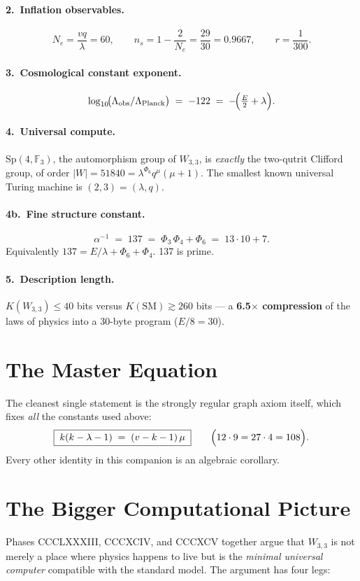 \documentclass[11pt,a4paper]{article}
\begin{document}
\paragraph{2.\ Inflation observables.}
\[
N_e=\frac{vq}{\lambda}=60,\qquad n_s=1-\frac{2}{N_e}=\frac{29}{30}=0.9667,\qquad r=\frac{1}{300}.
\]

\paragraph{3.\ Cosmological constant exponent.}
\[
\log_{10}\!\bigl(\Lambda_{\rm obs}/\Lambda_{\rm Planck}\bigr) \;=\; -122 \;=\; -\!\Bigl(\tfrac{E}{2}+\lambda\Bigr).
\]

\paragraph{4.\ Universal compute.}
$\mathrm{Sp}(4,\mathbb{F}_3)$, the automorphism group of $W_{3,3}$, is
\emph{exactly} the two-qutrit Clifford group, of order
$|W|=51840=\lambda^{\Phi_6}q^{\mu}(\mu+1)$. The smallest known
universal Turing machine is $(2,3)=(\lambda,q)$.

\paragraph{4b.\ Fine structure constant.}
\[
\alpha^{-1} \;=\; 137 \;=\; \Phi_3\,\Phi_4 + \Phi_6 \;=\; 13\cdot 10 + 7.
\]
Equivalently $137 = E/\lambda + \Phi_6 + \Phi_4$. 137 is prime.

\paragraph{5.\ Description length.}
$K(W_{3,3})\le 40$ bits versus $K(\mathrm{SM})\gtrsim 260$ bits — a
\textbf{6.5$\times$ compression} of the laws of physics into a
30-byte program ($E/8 = 30$).

\section{The Master Equation}
The cleanest single statement is the strongly regular graph axiom
itself, which fixes \emph{all} the constants used above:
\[
\boxed{\;k(k-\lambda-1)\;=\;(v-k-1)\,\mu\;}\qquad
\Bigl(12\cdot 9 = 27\cdot 4 = 108\Bigr).
\]
Every other identity in this companion is an algebraic corollary.

\section{The Bigger Computational Picture}
Phases CCCLXXXIII, CCCXCIV, and CCCXCV together argue that
$W_{3,3}$ is not merely a place where physics happens to live but is
the \emph{minimal universal computer} compatible with the standard
model. The argument has four legs:
\end{document}

